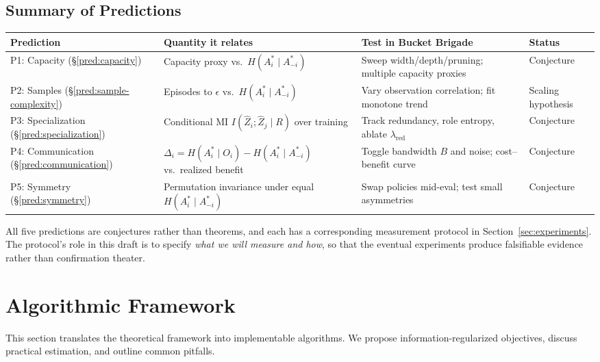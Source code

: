 \documentclass[10pt, letterpaper]{article}
\begin{document}
\subsection{Summary of Predictions}

\begin{center}
\small
\begin{tabular}{p{2.4cm} p{4.4cm} p{4.8cm} p{2.4cm}}
\toprule
\textbf{Prediction} & \textbf{Quantity it relates} & \textbf{Test in Bucket Brigade} & \textbf{Status} \\
\midrule
P1: Capacity (\S\ref{pred:capacity}) & Capacity proxy vs.\ $H(A_i^* \mid A_{-i}^*)$ & Sweep width/depth/pruning; multiple capacity proxies & Conjecture \\
P2: Samples (\S\ref{pred:sample-complexity}) & Episodes to $\epsilon$ vs.\ $H(A_i^* \mid A_{-i}^*)$ & Vary observation correlation; fit monotone trend & Scaling hypothesis \\
P3: Specialization (\S\ref{pred:specialization}) & Conditional MI $I(\hat{Z}_i; \hat{Z}_j \mid R)$ over training & Track redundancy, role entropy, ablate $\lambda_\text{red}$ & Conjecture \\
P4: Communication (\S\ref{pred:communication}) & $\Delta_i = H(A_i^*\mid O_i) - H(A_i^*\mid A_{-i}^*)$ vs.\ realized benefit & Toggle bandwidth $B$ and noise; cost--benefit curve & Conjecture \\
P5: Symmetry (\S\ref{pred:symmetry}) & Permutation invariance under equal $H(A_i^*\mid A_{-i}^*)$ & Swap policies mid-eval; test small asymmetries & Conjecture \\
\bottomrule
\end{tabular}
\end{center}

All five predictions are conjectures rather than theorems, and each has a corresponding measurement protocol in Section~\ref{sec:experiments}. The protocol's role in this draft is to specify \emph{what we will measure and how}, so that the eventual experiments produce falsifiable evidence rather than confirmation theater.

\section{Algorithmic Framework}
\label{sec:algorithm}

This section translates the theoretical framework into implementable algorithms. We propose information-regularized objectives, discuss practical estimation, and outline common pitfalls.
\end{document}

